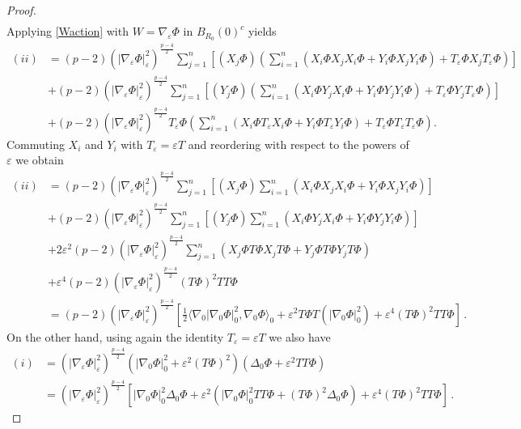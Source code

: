 \documentclass[10pt]{amsart}
\numberwithin{equation}{section}
\theoremstyle{definition}
\newcommand{\eps}{\varepsilon}
\newcommand{\scal}[2]{\langle {#1},{#2}\rangle}
\newcommand{\egrad}{\nabla_{\eps}}
\newcommand{\eT}{T_{\eps}}
\begin{document}
\begin{proof}
\begin{equation}
\begin{aligned}
\end{aligned}
\end{equation}
Applying \eqref{Waction} with $W=\nabla_\varepsilon \Phi$ in $B_{R_0}(0)^c$ yields 
\begin{equation*}
\begin{aligned}
(ii) &= (p-2) \left(|\egrad \Phi|_\varepsilon^2 \right)^{\tfrac{p-4}{2}} \sum_{j=1}^{n}\left[(X_j \Phi)\left(\sum_{i=1}^{n} (X_i\Phi X_j X_i \Phi + Y_i \Phi X_j Y_i \Phi) + \eT \Phi X_j \eT \Phi \right)\right]\\
&+ (p-2) \left(|\egrad \Phi|_\varepsilon^2 \right)^{\tfrac{p-4}{2}}\sum_{j=1}^{n}\left[(Y_j \Phi) \left(\sum_{i=1}^{n}(X_i \Phi Y_j X_i \Phi + Y_i \Phi Y_j Y_i \Phi )+ \eT \Phi Y_j \eT \Phi\right)\right]\\
&+ (p-2) \left(|\egrad \Phi|_\varepsilon^2 \right)^{\tfrac{p-4}{2}} \eT \Phi \left( \sum_{i=1}^{n}(X_i \Phi \eT X_i \Phi + Y_i \Phi \eT Y_i \Phi) + \eT \Phi \eT \eT \Phi \right).
\end{aligned}
\end{equation*}
Commuting $X_i$ and $Y_i$ with $T_\varepsilon=\varepsilon T$ and reordering with respect to the powers of $\eps$ we obtain
\begin{equation}
\label{(ii)}
\begin{aligned}
(ii)&= (p-2)\left(|\egrad \Phi|_\varepsilon^2 \right)^{\tfrac{p-4}{2}} \sum_{j=1}^{n}\left[(X_j \Phi)\sum_{i=1}^{n} (X_i\Phi X_j X_i \Phi + Y_i \Phi X_j Y_i \Phi) \right]\\
&+ (p-2) \left(|\egrad \Phi|_\varepsilon^2 \right)^{\tfrac{p-4}{2}}\sum_{j=1}^{n}\left[ (Y_j \Phi) \sum_{i=1}^{n}(X_i \Phi Y_j X_i \Phi + Y_i \Phi Y_j Y_i \Phi ) \right]\\
&+2\eps^2 (p-2)\left(|\egrad \Phi|_\varepsilon^2 \right)^{\tfrac{p-4}{2}} \sum_{j=1}^{n}\left(X_j \Phi T\Phi  X_j T\Phi + Y_j \Phi T\Phi Y_j T\Phi \right) \\
&+ \eps^4 (p-2) \left(|\egrad \Phi|_\varepsilon^2 \right)^{\tfrac{p-4}{2}}  (T\Phi )^2 TT\Phi \\
&=  (p-2)\left(|\egrad \Phi|_\varepsilon^2 \right)^{\tfrac{p-4}{2}} \left[  \frac12\scal{\nabla_0 |\nabla_0 \Phi|^2_0}{\nabla_0 \Phi}_0 +\varepsilon^2 T\Phi T \left( |\nabla_0 \Phi|^2_0\right)+ \varepsilon^4(T\Phi)^2 TT\Phi \right] \,.
\end{aligned}
\end{equation}
On the other hand, using again the identity $T_\varepsilon= \varepsilon T$ we also have 
\begin{equation}
\label{(i)}
\begin{aligned}
(i) &= \left(|\egrad \Phi|_\varepsilon^2 \right)^{\tfrac{p-4}{2}} \left( |\nabla_0 \Phi|_0^{2} + \eps^2 (T\Phi)^2 \right) (\Delta_0 \Phi + \eps^2 TT\Phi)\\
&= \left(|\egrad \Phi|_\varepsilon^2 \right)^{\tfrac{p-4}{2}} \left[ |\nabla_0 \Phi|_0^{2}\Delta_0 \Phi+ \varepsilon^2 \left( |\nabla_0 \Phi|_0^{2}TT\Phi+ (T\Phi)^2 \Delta_0 \Phi\right) +\varepsilon^4 (T\Phi)^2TT\Phi \right]\,.
\end{aligned}
\end{equation}


\end{proof}
\end{document}
